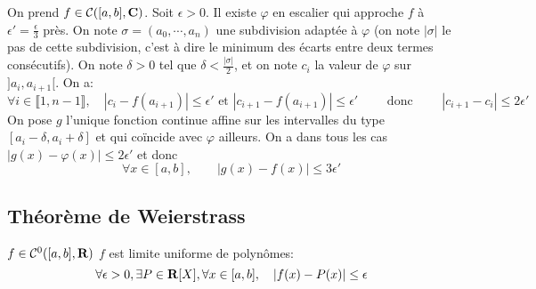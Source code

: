 On prend $f \in  \mathcal  C([a, b], \mathbf C)$. Soit $\epsilon>0$. Il existe  $\varphi$ en escalier qui approche  $f$ à  $\epsilon'=\frac{\epsilon}{3}$ près. On note $\sigma=(a_0, \cdots , a_n)$ une subdivision adaptée à $\varphi$ (on note $|\sigma|$ le pas de cette subdivision, c'est à dire le minimum des écarts entre deux termes consécutifs). On note $\delta>0$ tel que  $\delta < \frac{|\sigma|}{2}$, et on note $c_i$ la valeur de  $\varphi$ sur  $]a_i, a_{i+1}[$. On a: \[
    \forall  i \in  \llbracket 1, n-1 \rrbracket , \quad  |c_i-f(a_{i+1})|\leq \epsilon' \text{ et } |c_{i+1}-f(a_{i+1})|\leq \epsilon' \qquad  \text{ donc } \qquad  |c_{i+1}-c_i| \leq 2\epsilon'
\] 
On pose $g$ l'unique fonction continue affine sur les intervalles du type $[a_i-\delta, a_i+\delta]$ et qui coïncide avec  $\varphi$ ailleurs. On a dans tous les cas $|g(x)-\varphi(x)|\leq 2\epsilon'$ et donc \[
    \forall  x \in  [a, b] , \qquad  |g(x)-f(x)|\leq 3\epsilon'
\] 

\subsection{Théorème de Weierstrass}

\begin{thm}
    \Hyp $f \in  \mathcal  C^0([a, b], \mathbf R)$
    \Conc $f$ est limite uniforme de polynômes:  \[
        \forall  \epsilon>0, \exists  P \in  \mathbf R[X], \forall  x \in  [a, b], \quad  |f(x)-P(x)|\leq \epsilon
    \] 
\end{thm}

